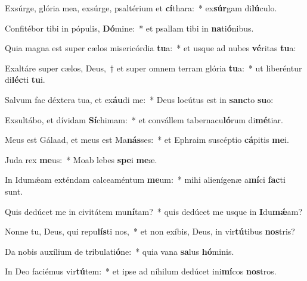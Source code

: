 \item Exsúrge, glória mea, exsúrge, psaltérium et \textbf{cí}thara:~* ex\textbf{súr}gam di\textbf{lú}culo.
\item Confitébor tibi in pópulis, \textbf{Dó}mine:~* et psallam tibi in \textbf{na}ti\textbf{ó}nibus.
\item Quia magna est super cælos misericórdia \textbf{tu}a:~* et usque ad nubes \textbf{vé}ritas \textbf{tu}a:
\item Exaltáre super cælos, Deus,~† et super omnem terram glória \textbf{tu}a:~* ut liberéntur di\textbf{léc}ti \textbf{tu}i.
\item Salvum fac déxtera tua, et ex\textbf{áu}di me:~* Deus locútus est in \textbf{sanc}to \textbf{su}o:
\item Exsultábo, et dívidam \textbf{Sí}chimam:~* et convállem tabernacu\textbf{ló}rum di\textbf{mé}tiar.
\item Meus est Gálaad, et meus est Ma\textbf{nás}ses:~* et Ephraim suscéptio \textbf{cá}pitis \textbf{me}i.
\item Juda rex \textbf{me}us:~* Moab lebes \textbf{spe}i \textbf{me}æ.
\item In Idumǽam exténdam calceaméntum \textbf{me}um:~* mihi alienígenæ a\textbf{mí}ci \textbf{fac}ti sunt.
\item Quis dedúcet me in civitátem mu\textbf{ní}tam?~* quis dedúcet me usque in \textbf{I}du\textbf{mǽ}am?
\item Nonne tu, Deus, qui repu\textbf{lís}ti nos,~* et non exíbis, Deus, in vir\textbf{tú}tibus \textbf{nos}tris?
\item Da nobis auxílium de tribulati\textbf{ó}ne:~* quia vana \textbf{sa}lus \textbf{hó}minis.
\item In Deo faciémus vir\textbf{tú}tem:~* et ipse ad níhilum dedúcet ini\textbf{mí}cos \textbf{nos}tros.
